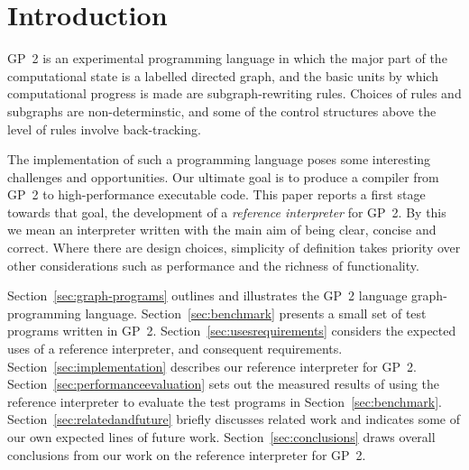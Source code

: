 \section{Introduction}

GP~2 is an experimental programming language in which the major part of
the computational state is a labelled directed graph, and the basic
units by which computational progress is made are subgraph-rewriting
rules.
Choices of rules and subgraphs are non-determinstic, and some of
the control structures above the level of rules involve back-tracking.

The implementation of such a programming language poses some
interesting challenges and opportunities.
Our ultimate goal is to produce a compiler from GP~2 to
high-performance executable code.
This paper reports a first stage towards that goal, the development
of a \emph{reference interpreter} for GP~2.
By this we mean an interpreter written with the main aim of
being clear, concise and correct.
Where there are design choices, simplicity of
definition takes priority over other considerations
such as performance and the richness of functionality.

Section~\ref{sec:graph-programs} outlines and illustrates the GP~2 language
graph-programming language.
Section~\ref{sec:benchmark} presents a small set of test programs
written in GP~2.
Section~\ref{sec:usesrequirements} considers the expected uses of
a reference interpreter, and consequent requirements.
Section~\ref{sec:implementation} describes our reference interpreter for
GP~2.
Section~\ref{sec:performanceevaluation} sets out the measured results of using the reference
interpreter to evaluate the test programs in Section~\ref{sec:benchmark}.
Section~\ref{sec:relatedandfuture} briefly discusses related work and
indicates some of our own expected lines of future work.
Section~\ref{sec:conclusions} draws overall conclusions from our work
on the reference interpreter for GP~2.

